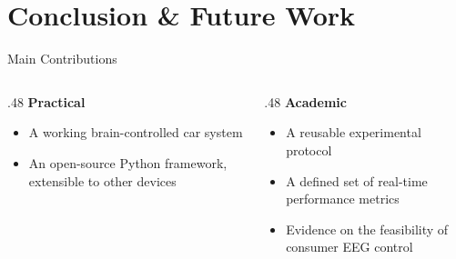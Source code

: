 \documentclass[aspectratio=169,11pt]{beamer}
\begin{document}
\section{Conclusion \& Future Work}

\begin{frame}{Main Contributions}
  \begin{columns}[T]
    \begin{column}{.48\textwidth}
      \textbf{Practical}\par\smallskip
      \begin{itemize}
        \item A working brain-controlled car system
        \item An open-source Python framework, extensible to other devices
      \end{itemize}
    \end{column}
    \begin{column}{.48\textwidth}
      \textbf{Academic}\par\smallskip
      \begin{itemize}
        \item A reusable experimental protocol
        \item A defined set of real-time performance metrics
        \item Evidence on the feasibility of consumer EEG control
      \end{itemize}
    \end{column}
  \end{columns}
\end{frame}
\end{document}
